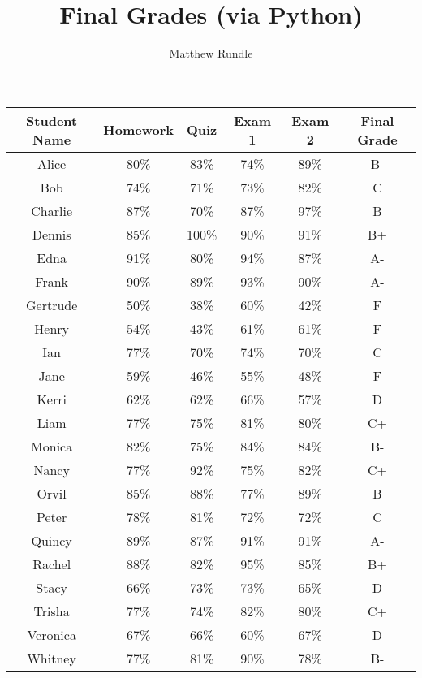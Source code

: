 \documentclass{article}
\title{Final Grades (via Python)}
\author{Matthew Rundle}
\begin{document}
\maketitle

\begin{table}[H]
\centering
\begin{tabular}{ | c | c | c | c | c | c | } \hline
Student Name & Homework & Quiz & Exam 1 & Exam 2 & Final Grade \\ \hline
Alice & 80\% & 83\% & 74\% & 89\% & B-\\ \hline
Bob & 74\% & 71\% & 73\% & 82\% & C\\ \hline
Charlie & 87\% & 70\% & 87\% & 97\% & B\\ \hline
Dennis & 85\% & 100\% & 90\% & 91\% & B+\\ \hline
Edna & 91\% & 80\% & 94\% & 87\% & A-\\ \hline
Frank & 90\% & 89\% & 93\% & 90\% & A-\\ \hline
Gertrude & 50\% & 38\% & 60\% & 42\% & F\\ \hline
Henry & 54\% & 43\% & 61\% & 61\% & F\\ \hline
Ian & 77\% & 70\% & 74\% & 70\% & C\\ \hline
Jane & 59\% & 46\% & 55\% & 48\% & F\\ \hline
Kerri & 62\% & 62\% & 66\% & 57\% & D\\ \hline
Liam & 77\% & 75\% & 81\% & 80\% & C+\\ \hline
Monica & 82\% & 75\% & 84\% & 84\% & B-\\ \hline
Nancy & 77\% & 92\% & 75\% & 82\% & C+\\ \hline
Orvil & 85\% & 88\% & 77\% & 89\% & B\\ \hline
Peter & 78\% & 81\% & 72\% & 72\% & C\\ \hline
Quincy & 89\% & 87\% & 91\% & 91\% & A-\\ \hline
Rachel & 88\% & 82\% & 95\% & 85\% & B+\\ \hline
Stacy & 66\% & 73\% & 73\% & 65\% & D\\ \hline
Trisha & 77\% & 74\% & 82\% & 80\% & C+\\ \hline
Veronica & 67\% & 66\% & 60\% & 67\% & D\\ \hline
Whitney & 77\% & 81\% & 90\% & 78\% & B-\\ \hline
\end{tabular}
\end{table}
\end{document}
